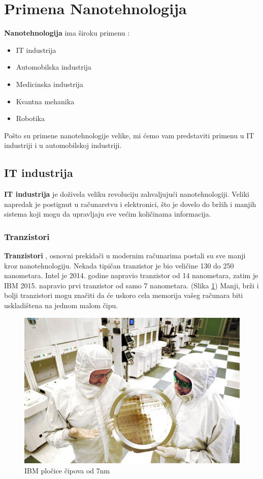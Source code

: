 \documentclass[a4paper]{article}
\begin{document}
{\section{Primena Nanotehnologija}
\textbf{Nanotehnologija} ima široku primenu \cite{treciLink}: 
\begin{itemize}
    \item[1] IT industrija
    \item[2] Automobilska industrija
    \item[3] Medicinska industrija 
    \item[4] Kvantna mehanika
    \item[5] Robotika
\end{itemize}

Pošto su primene nanotehnologije velike, mi ćemo vam predstaviti primenu u IT industriji i u automobilskoj industriji.\\


\subsection{IT industrija}

\textbf{IT industrija} je doživela veliku revoluciju zahvaljujući nanotehnologiji. Veliki napredak je postignut u računarstvu i elektronici, što je dovelo do bržih i manjih sistema koji mogu da upravljaju sve većim količinama informacija.\\
\subsubsection{Tranzistori}
\textbf{Tranzistori} \cite{cetvrtiLink}, osnovni prekidači u modernim računarima postali su sve manji kroz nanotehnologiju. Nekada tipičan tranzistor je bio veličine 130 do 250 nanometara. Intel je 2014. godine napravio tranzistor od 14 nanometara, zatim je IBM 2015. napravio prvi tranzistor od samo 7 nanometara. (Slika \ref{slika_4}) Manji, brži i bolji tranzistori mogu značiti da će uskoro cela memorija vašeg računara biti uskladištena na jednom malom čipu.\\

\begin{figure}[H]
    \centering
    \includegraphics[width=.6\textwidth]{slika 4.jpg}
    \caption{IBM pločice čipova od 7nm}
    \label{slika_4}
\end{figure}

}
\end{document}
